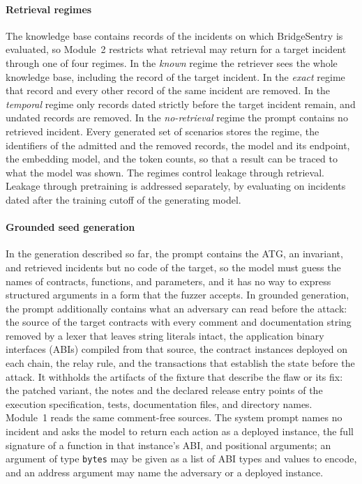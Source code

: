 \documentclass[a4paper]{cas-sc}
\begin{document}
\paragraph{Retrieval regimes}
The knowledge base contains records of the incidents on which BridgeSentry is evaluated, so Module~2 restricts what retrieval may return for a target incident through one of four regimes. In the \emph{known} regime the retriever sees the whole knowledge base, including the record of the target incident. In the \emph{exact} regime that record and every other record of the same incident are removed. In the \emph{temporal} regime only records dated strictly before the target incident remain, and undated records are removed. In the \emph{no-retrieval} regime the prompt contains no retrieved incident. Every generated set of scenarios stores the regime, the identifiers of the admitted and the removed records, the model and its endpoint, the embedding model, and the token counts, so that a result can be traced to what the model was shown. The regimes control leakage through retrieval. Leakage through pretraining is addressed separately, by evaluating on incidents dated after the training cutoff of the generating model.

\paragraph{Grounded seed generation}
In the generation described so far, the prompt contains the ATG, an invariant, and retrieved incidents but no code of the target, so the model must guess the names of contracts, functions, and parameters, and it has no way to express structured arguments in a form that the fuzzer accepts. In grounded generation, the prompt additionally contains what an adversary can read before the attack: the source of the target contracts with every comment and documentation string removed by a lexer that leaves string literals intact, the application binary interfaces (ABIs) compiled from that source, the contract instances deployed on each chain, the relay rule, and the transactions that establish the state before the attack. It withholds the artifacts of the fixture that describe the flaw or its fix: the patched variant, the notes and the declared release entry points of the execution specification, tests, documentation files, and directory names. Module~1 reads the same comment-free sources. The system prompt names no incident and asks the model to return each action as a deployed instance, the full signature of a function in that instance's ABI, and positional arguments; an argument of type \texttt{bytes} may be given as a list of ABI types and values to encode, and an address argument may name the adversary or a deployed instance.
\end{document}

